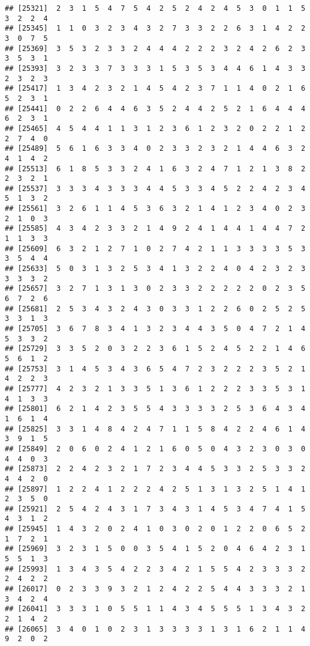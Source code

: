 \documentclass[
]{article}
\begin{document}
\begin{verbatim}
## [25321]  2  3  1  5  4  7  5  4  2  5  2  4  2  4  5  3  0  1  1  5  3  2  2  4
## [25345]  1  1  0  3  2  3  4  3  2  7  3  3  2  2  6  3  1  4  2  2  3  0  7  5
## [25369]  3  5  3  2  3  3  2  4  4  4  2  2  2  3  2  4  2  6  2  3  3  5  3  1
## [25393]  3  2  3  3  7  3  3  3  1  5  3  5  3  4  4  6  1  4  3  3  2  3  2  3
## [25417]  1  3  4  2  3  2  1  4  5  4  2  3  7  1  1  4  0  2  1  6  5  2  3  1
## [25441]  0  2  2  6  4  4  6  3  5  2  4  4  2  5  2  1  6  4  4  4  6  2  3  1
## [25465]  4  5  4  4  1  1  3  1  2  3  6  1  2  3  2  0  2  2  1  2  2  7  4  0
## [25489]  5  6  1  6  3  3  4  0  2  3  3  2  3  2  1  4  4  6  3  2  4  1  4  2
## [25513]  6  1  8  5  3  3  2  4  1  6  3  2  4  7  1  2  1  3  8  2  2  3  2  1
## [25537]  3  3  3  4  3  3  3  4  4  5  3  3  4  5  2  2  4  2  3  4  5  1  3  2
## [25561]  3  2  6  1  1  4  5  3  6  3  2  1  4  1  2  3  4  0  2  3  2  1  0  3
## [25585]  4  3  4  2  3  3  2  1  4  9  2  4  1  4  4  1  4  4  7  2  1  1  3  3
## [25609]  6  3  2  1  2  7  1  0  2  7  4  2  1  1  3  3  3  3  5  3  3  5  4  4
## [25633]  5  0  3  1  3  2  5  3  4  1  3  2  2  4  0  4  2  3  2  3  3  3  3  2
## [25657]  3  2  7  1  3  1  3  0  2  3  3  2  2  2  2  2  0  2  3  5  6  7  2  6
## [25681]  2  5  3  4  3  2  4  3  0  3  3  1  2  2  6  0  2  5  2  5  3  3  1  3
## [25705]  3  6  7  8  3  4  1  3  2  3  4  4  3  5  0  4  7  2  1  4  5  3  3  2
## [25729]  3  3  5  2  0  3  2  2  3  6  1  5  2  4  5  2  2  1  4  6  5  6  1  2
## [25753]  3  1  4  5  3  4  3  6  5  4  7  2  3  2  2  2  3  5  2  1  4  2  2  3
## [25777]  4  2  3  2  1  3  3  5  1  3  6  1  2  2  2  3  3  5  3  1  4  1  3  3
## [25801]  6  2  1  4  2  3  5  5  4  3  3  3  3  2  5  3  6  4  3  4  1  6  1  4
## [25825]  3  3  1  4  8  4  2  4  7  1  1  5  8  4  2  2  4  6  1  4  3  9  1  5
## [25849]  2  0  6  0  2  4  1  2  1  6  0  5  0  4  3  2  3  0  3  0  4  4  0  3
## [25873]  2  2  4  2  3  2  1  7  2  3  4  4  5  3  3  2  5  3  3  2  4  4  2  0
## [25897]  1  2  2  4  1  2  2  2  4  2  5  1  3  1  3  2  5  1  4  1  2  3  5  0
## [25921]  2  5  4  2  4  3  1  7  3  4  3  1  4  5  3  4  7  4  1  5  4  3  1  2
## [25945]  1  4  3  2  0  2  4  1  0  3  0  2  0  1  2  2  0  6  5  2  1  7  2  1
## [25969]  3  2  3  1  5  0  0  3  5  4  1  5  2  0  4  6  4  2  3  1  5  5  1  3
## [25993]  1  3  4  3  5  4  2  2  3  4  2  1  5  5  4  2  3  3  3  2  2  4  2  2
## [26017]  0  2  3  3  9  3  2  1  2  4  2  2  5  4  4  3  3  3  2  1  3  4  2  4
## [26041]  3  3  3  1  0  5  5  1  1  4  3  4  5  5  5  1  3  4  3  2  2  1  4  2
## [26065]  3  4  0  1  0  2  3  1  3  3  3  3  1  3  1  6  2  1  1  4  9  2  0  2

\end{verbatim}
\end{document}
